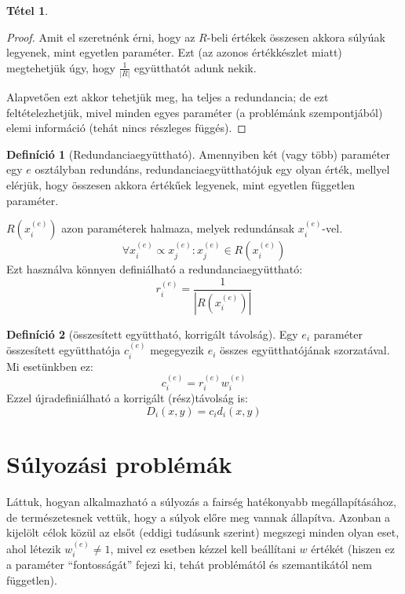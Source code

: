 \documentclass{article}
\theoremstyle{definition}
\newtheorem{definition}{Definíció}[section]
\newtheorem{theorem}{Tétel}[section]
\newcommand{\ent}[2]{ {#1}^{(#2)} }
\begin{document}
\begin{multicols}{2}
\begin{theorem}
\begin{proof}
            Amit el szeretnénk érni, hogy az $R$-beli értékek összesen akkora súlyúak legyenek, mint egyetlen paraméter. Ezt (az azonos értékkészlet miatt) megtehetjük úgy, hogy $\frac{1}{|R|}$ együtthatót adunk nekik.
            
            Alapvetően ezt akkor tehetjük meg, ha teljes a redundancia; de ezt feltételezhetjük, mivel minden egyes paraméter (a problémánk szempontjából) elemi információ (tehát nincs részleges függés).
        \end{proof}
    \end{theorem}
    
    \begin{definition}[Redundanciaegyüttható]
        Amennyiben két (vagy több) paraméter egy $e$ osztályban redundáns, redundanciaegyütthatójuk egy olyan érték, mellyel elérjük, hogy összesen akkora értékűek legyenek, mint egyetlen független paraméter.
        
        $R(\ent x e _i)$ azon paraméterek halmaza, melyek redundánsak $\ent x e _i$-vel.
        \begin{equation}
            \forall \ent x e _i \propto \ent x e _j : \ent x e _j \in R(\ent x e _i) 
        \end{equation}
        Ezt használva könnyen definiálható a redundanciaegyüttható:
        \begin{equation}
            \ent r e _i = \frac{1}{|R(\ent x e _i)|}
        \end{equation}
    \end{definition}
    
    \begin{definition}[összesített együttható, korrigált távolság]
        Egy $e_i$ paraméter összesített együtthatója $\ent c e _i$ megegyezik $e_i$ összes együtthatójának szorzatával. Mi esetünkben ez:
        \begin{equation}
            \ent c e _i = \ent r e _i \ent w e _i
        \end{equation}
        Ezzel újradefiniálható a korrigált (rész)távolság is:
        \begin{equation}
            D_i(x, y) = c_i d_i(x, y)
        \end{equation}
    \end{definition}

\section{Súlyozási problémák}
    Láttuk, hogyan alkalmazható a súlyozás a fairség hatékonyabb megállapításához, de természetesnek vettük, hogy a súlyok előre meg vannak állapítva. Azonban a kijelölt célok közül az elsőt (eddigi tudásunk szerint) megszegi minden olyan eset, ahol létezik $\ent w e _i \neq 1$, mivel ez esetben kézzel kell beállítani $w$ értékét (hiszen ez a paraméter \enquote{fontosságát} fejezi ki, tehát problémától és szemantikától nem független).
    

\end{multicols}
\end{document}
